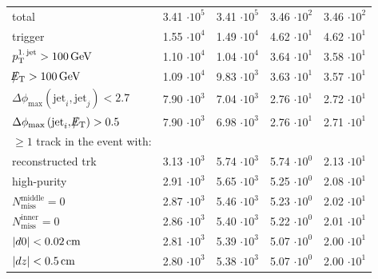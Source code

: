 \begin{table}[!h]
{\begin{tabular}{|l|c|c|c|c|}
total                                                                                & 3.41 $\cdot10^{5 }$ & 3.41 $\cdot10^{5 }$ & 3.46 $\cdot10^{2 }$ & 3.46 $\cdot10^{2 }$ \\
trigger                                                                                   & 1.55 $\cdot10^{4 }$ & 1.49 $\cdot10^{4 }$ & 4.62 $\cdot10^{1 }$ & 4.62 $\cdot10^{1 }$ \\
$p_{\text{T}}^{\text{1.\,jet}}>100\,\text{Ge}\kern-0.06667em\text{V}$                                                                     & 1.10 $\cdot10^{4 }$ & 1.04 $\cdot10^{4 }$ & 3.64 $\cdot10^{1 }$ & 3.58 $\cdot10^{1 }$ \\
$\slash\mkern-12mu{E}_{\text{T}}>100\,\text{Ge}\kern-0.06667em\text{V}$                                                                            & 1.09 $\cdot10^{4 }$ & 9.83 $\cdot10^{3 }$ & 3.63 $\cdot10^{1 }$ & 3.57 $\cdot10^{1 }$ \\
$\Delta\phi_{\text{max}} \left( \text{jet}_i, \text{jet}_j  \right)<2.7$                  & 7.90 $\cdot10^{3 }$ & 7.04 $\cdot10^{3 }$ & 2.76 $\cdot10^{1 }$ & 2.72 $\cdot10^{1 }$ \\
$\Delta\phi_{\text{max}} \left( \text{jet}_i, \slash\mkern-12mu{E}_{\text{T}}  \right)>0.5$                          & 7.90 $\cdot10^{3 }$ & 6.98 $\cdot10^{3 }$ & 2.76 $\cdot10^{1 }$ & 2.71 $\cdot10^{1 }$ \\
$\geq1$ track in the event with:                                                          &&&&\\
reconstructed trk                                                                         & 3.13 $\cdot10^{3 }$ & 5.74 $\cdot10^{3 }$ & 5.74 $\cdot10^{0 }$ & 2.13 $\cdot10^{1 }$ \\
high-purity                                                                               & 2.91 $\cdot10^{3 }$ & 5.65 $\cdot10^{3 }$ & 5.25 $\cdot10^{0 }$ & 2.08 $\cdot10^{1 }$ \\
$N_{\text{miss}}^{\text{middle}}=0$                                                       & 2.87 $\cdot10^{3 }$ & 5.46 $\cdot10^{3 }$ & 5.23 $\cdot10^{0 }$ & 2.02 $\cdot10^{1 }$ \\
$N_{\text{miss}}^{\text{inner}}=0$                                                        & 2.86 $\cdot10^{3 }$ & 5.40 $\cdot10^{3 }$ & 5.22 $\cdot10^{0 }$ & 2.01 $\cdot10^{1 }$ \\
$|d0|<0.02\,\text{cm}$                                                                            & 2.81 $\cdot10^{3 }$ & 5.39 $\cdot10^{3 }$ & 5.07 $\cdot10^{0 }$ & 2.00 $\cdot10^{1 }$ \\
$|dz|<0.5\,\text{cm}$                                                                             & 2.80 $\cdot10^{3 }$ & 5.38 $\cdot10^{3 }$ & 5.07 $\cdot10^{0 }$ & 2.00 $\cdot10^{1 }$ \\

\end{tabular}}
\end{table}
